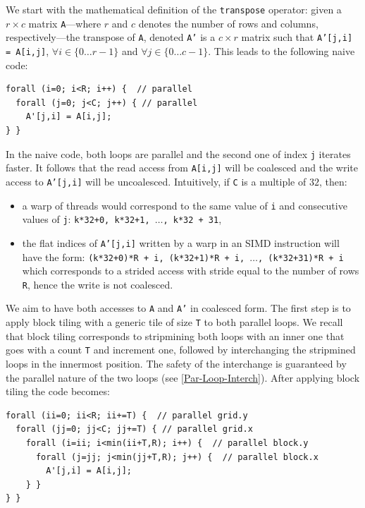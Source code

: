 \documentclass[acmsmall,review]{acmart}\settopmatter{printfolios=true,printccs=false,printacmref=false}
\begin{document}
We start with the mathematical definition of the {\tt transpose} operator:
given a $r\times c$ matrix {\tt A}---where $r$ and $c$ denotes the number
of rows and columns, respectively---the transpose of {\tt A}, denoted 
{\tt A'} is a $c\times r$ matrix such that {\tt A'[j,i] = A[i,j]}, 
$\forall i\in \{0 \ldots r-1\}$ and $\forall j\in\{0\ldots c-1\}$.
This leads to the following naive code:

\begin{lstlisting}[mathescape=true]
forall (i=0; i<R; i++) {  // parallel
  forall (j=0; j<C; j++) { // parallel
    A'[j,i] = A[i,j];
} }
\end{lstlisting}\vspace{-2ex}

In the naive code, both loops are parallel and the second one
of index {\tt j} iterates faster. It follows that the read access
from {\tt A[i,j]} will be coalesced and the write access to {\tt A'[j,i]}
will be uncoalesced. Intuitively, if {\tt C} is a multiple of $32$, then:
\begin{itemize}
    \item a warp of threads would correspond to the same value of {\tt i} and 
        consecutive values of {\tt j}: {\tt k*32+0, k*32+1, $\ldots$, k*32 + 31},
    \item the flat indices of {\tt A'[j,i]} written by a warp in an SIMD instruction
        will have the form: {\tt (k*32+0)*R + i, (k*32+1)*R + i, $\ldots$, (k*32+31)*R + i}
        which corresponds to a strided access with stride equal to the number of rows 
        {\tt R}, hence the write is not coalesced.
\end{itemize}

We aim to have both accesses to {\tt A} and {\tt A'} in coalesced form. 
The first step is to apply block tiling with a generic tile of size {\tt T}
to both parallel loops. We recall that block tiling corresponds to stripmining
both loops with an inner one that goes with a count {\tt T} and increment one,
followed by interchanging the stripmined loops in the innermost position.
The safety of the interchange is guaranteed by the parallel nature of the
two loops (see \cref{Par-Loop-Interch}). After applying block tiling the
code becomes:\smallskip

\begin{lstlisting}[mathescape=true]
forall (ii=0; ii<R; ii+=T) {  // parallel grid.y
  forall (jj=0; jj<C; jj+=T) { // parallel grid.x
    forall (i=ii; i<min(ii+T,R); i++) {  // parallel block.y
      forall (j=jj; j<min(jj+T,R); j++) {  // parallel block.x
        A'[j,i] = A[i,j];
    } }
} }
\end{lstlisting}
\end{document}
